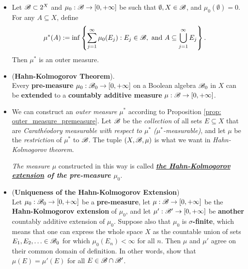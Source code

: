 \documentclass[11pt]{article}
\begin{document}
\begin{itemize}
\item \begin{proposition} \label{prop: outer_measure_premeasure}
Let ${\mathscr B} \subset 2^X$ and $\mu_0: {\mathscr B} \rightarrow [0, +\infty]$ be such that $\emptyset, X \in {\mathscr B}$, and $\mu_0(\emptyset) = 0$. For any $A \subseteq X$, define 
\begin{align*}
\mu^{*}(A) &:= \inf\left\{\sum_{j=1}^{\infty}\mu_0(E_j): E_j \in {\mathscr B}, \text{ and } A \subseteq \bigcup_{j=1}^{\infty}E_j\right\}. 
\end{align*} Then $\mu^{*}$ is an outer measure. 
\end{proposition}

\item \begin{theorem} (\textbf{Hahn-Kolmogorov Theorem}).\\
Every \textbf{pre-measure} $\mu_0 : {\mathscr B}_0 \rightarrow [0, +\infty]$  on a Boolean algebra ${\mathscr B}_{0}$ in $X$ can be \textbf{extended} to a \textbf{countably additive measure} $\mu : {\mathscr B} \rightarrow [0, +\infty]$.
\end{theorem}

\item \begin{remark}
We can construct an \emph{outer measure} $\mu^{*}$ according to Proposition \ref{prop: outer_measure_premeasure}. Let ${\mathscr B}$ be the \emph{collection} of all sets $E \subseteq X$ that are \textit{Carath\'eodory measurable with respect to $\mu^{*}$ ($\mu^{*}$-measurable)}, and let $\mu$ be the \emph{restriction} of $\mu^{*}$  to ${\mathscr B}$. The tuple $(X, {\mathscr B}, \mu)$ is what we want in \emph{Hahn-Kolmogorov theorem}. 

\emph{The measure $\mu$} constructed in this way is called \emph{\textbf{ \underline{the Hahn-Kolmogorov extension} of the pre-measure $\mu_0$}}. 
\end{remark}

\item \begin{proposition} (\textbf{Uniqueness of the Hahn-Kolmogorov Extension})\\
Let $\mu_0 : {\mathscr B}_0 \rightarrow [0, +\infty]$ be a \textbf{pre-measure}, let $\mu : {\mathscr B} \rightarrow [0, +\infty]$ be the \textbf{Hahn-Kolmogorov extension} of $\mu_0$, and let $\mu' : {\mathscr B}' \rightarrow  [0, +\infty]$ be \textbf{another} countably additive extension of $\mu_0$. Suppose also that $\mu_0$ is \textbf{$\sigma$-finite}, which means that one can express the whole space $X$ as the countable union of sets $E_1, E_2, \ldots \in {\mathscr B}_{0}$ for which $\mu_0(E_n) < \infty$ for all $n$. Then $\mu$ and $\mu'$ agree on their common domain of definition. In other words, show that  $\mu(E) = \mu'(E)$ for all $E \in {\mathscr B} \cap {\mathscr B}'$.
\end{proposition}
\end{itemize}
\newpage
\end{document}
